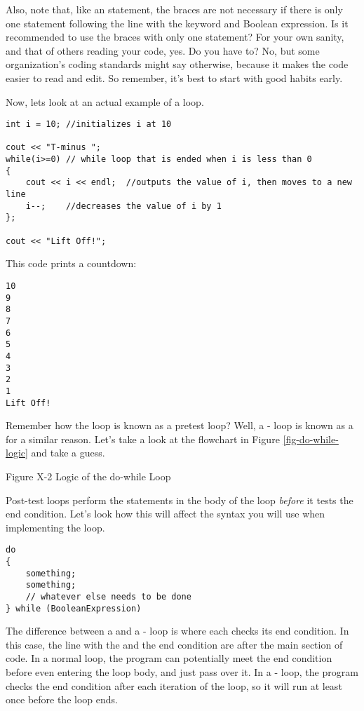 Also, note that, like an  statement, the braces are not necessary if there is only one statement following the line with the  keyword and Boolean expression.
Is it recommended to use the braces with only one statement?
For your own sanity, and that of others reading your code, yes.
Do you have to?
No, but some organization's coding standards might say otherwise, because it makes the code easier to read and edit.
So remember, it’s best to start with good habits early.

Now, lets look at an actual example of a  loop.

\begin{lstlisting}
int i = 10;	//initializes i at 10

cout << "T-minus ";
while(i>=0)	// while loop that is ended when i is less than 0
{
	cout << i << endl;	//outputs the value of i, then moves to a new line
	i--;	//decreases the value of i by 1
};

cout << "Lift Off!";
\end{lstlisting}

This code prints a countdown:

\begin{lstlisting}
10
9
8
7
6
5
4
3
2
1
Lift Off!
\end{lstlisting}



Remember how the  loop is known as a pretest loop?
Well, a - loop is known as a  for a similar reason.
Let's take a look at the flowchart in Figure \ref{fig-do-while-logic} and take a guess.

Figure X-2 Logic of the do-while Loop
\label{fig-do-while-logic}

Post-test loops perform the statements in the body of the loop \emph{before} it tests the end condition.
Let's look how this will affect the syntax you will use when implementing the loop.

\begin{lstlisting}
do
{
	something;
	something;
	// whatever else needs to be done
} while (BooleanExpression)
\end{lstlisting}

The difference between a  and a - loop is where each checks its end condition.
In this case, the line with the  and the end condition are after the main section of code.
In a normal  loop, the program can potentially meet the end condition before even entering the loop body, and just pass over it.
In a - loop, the program checks the end condition after each iteration of the loop, so it will run at least once before the loop ends.

